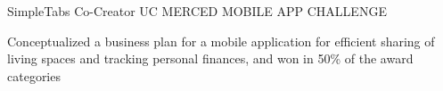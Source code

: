 

\begin{cventries}

  \cventry
    {SimpleTabs Co-Creator} %
    {UC MERCED MOBILE APP CHALLENGE} %
    { } %
    { } %
    {
      \begin{cvitems} %
        \item {Conceptualized a business plan for a mobile application for efficient sharing of living spaces \newline and tracking personal finances, and won in 50\% of the award categories}
      \end{cvitems}
    }



\end{cventries}
